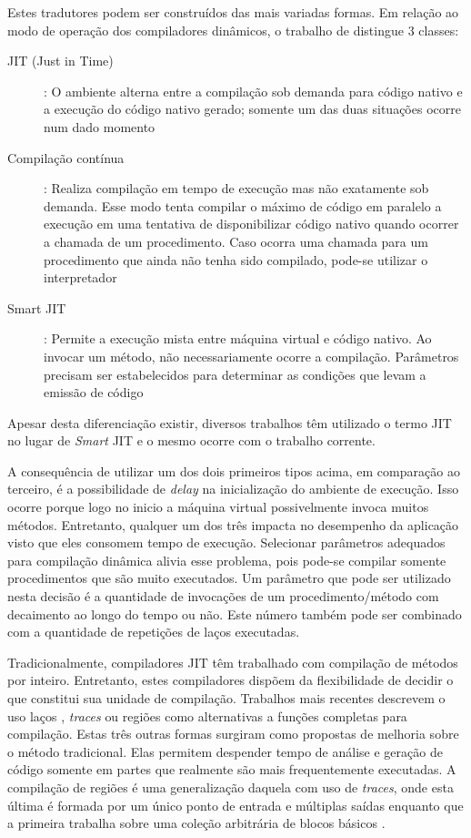 Estes tradutores podem ser construídos das mais variadas formas.
Em relação ao modo de operação dos compiladores dinâmicos, o trabalho
de  distingue 3 classes:
\begin{description}
  \item[JIT (Just in Time)]: O ambiente alterna entre a compilação sob
    demanda para código nativo e a execução do código nativo gerado;
    somente um das duas situações ocorre num dado momento
  \item[Compilação contínua]: Realiza compilação em tempo de execução
    mas não exatamente sob demanda. Esse modo tenta compilar o máximo
    de código em paralelo a execução em uma tentativa de disponibilizar
    código nativo quando ocorrer a chamada de um procedimento. Caso
    ocorra uma chamada para um procedimento que ainda não tenha sido
    compilado, pode-se utilizar o interpretador
  \item[Smart JIT]: Permite a execução mista entre máquina virtual e
    código nativo. Ao invocar um método, não necessariamente ocorre a
    compilação. Parâmetros precisam ser estabelecidos para determinar
    as condições que levam a emissão de código
\end{description}
Apesar desta diferenciação existir, diversos trabalhos
\cite{suganuma_oopsla_2001, suganuma_ibm, judo} têm utilizado o termo
JIT no lugar de \textit{Smart} JIT e o mesmo ocorre com o trabalho
corrente.

A consequência de utilizar um dos dois primeiros tipos acima, em
comparação ao terceiro, é a possibilidade de \textit{delay} na
inicialização do ambiente de execução. Isso ocorre porque logo
no inicio a máquina virtual possivelmente invoca muitos métodos.
Entretanto, qualquer um dos três
impacta no desempenho da aplicação visto que eles consomem tempo
de execução. Selecionar parâmetros adequados para compilação dinâmica
alivia esse problema, pois pode-se compilar somente procedimentos que
são muito executados. Um parâmetro que pode ser utilizado nesta
decisão é a quantidade de invocações de um
procedimento/método com decaimento ao longo do tempo \cite{holzle} ou
não. Este número também pode ser combinado com a quantidade de
repetições de laços executadas.

Tradicionalmente, compiladores JIT têm trabalhado com compilação de métodos
por inteiro. Entretanto, estes compiladores
dispõem da flexibilidade de decidir o que constitui sua
unidade de compilação. Trabalhos mais recentes descrevem o uso laços
\cite{jitcompunits}, \textit{traces}
\cite{jitcompunits} ou regiões \cite{regionunit} como alternativas a
funções completas para compilação. Estas três outras formas surgiram
como propostas de melhoria \cite{regionunit, jitcompunits} sobre o
método tradicional. Elas permitem
despender tempo de análise e geração de código somente em partes que
realmente são mais
frequentemente executadas. A compilação de regiões é uma generalização
daquela com uso de \textit{traces}, onde esta última é formada
por um único ponto de entrada e múltiplas saídas \cite{jitcompunits}
enquanto que a primeira trabalha sobre uma coleção arbitrária de
blocos básicos \cite{dragonbook}.

